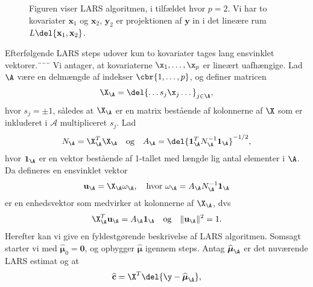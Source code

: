 %
\begin{figure}[H]
\centering
\scalebox{0.8}{}
\caption{Figuren viser LARS algoritmen, i tilfældet hvor $p = 2$. Vi har to kovariater  $\textbf{x}_1$ og $\textbf{x}_2$, $\textbf{y}_2$ er projektionen af $\textbf{y}$ in i det lineære rum $L  \del{ \textbf{x}_1, \textbf{x}_2} $. }\label{fig:lars}
\end{figure}
%
Efterfølgende LARS steps udover kun to kovariater tages lang ensvinklet vektorer.¨¨¨
Vi antager, at kovariaterne \(\x_1, \ldots, \x_p\) er lineært uafhængige.
Lad \(\A\) være en delmængde af indekser \(\cbr{1,\ldots, p}\), og definer matricen
\begin{align}
\X_\A = \del{\dots s_j \x_j \dots}_{j \in \A}, \label{eq:lars_2.4}
\end{align}
hvor  $s_j = \pm 1$, således at \(\X_\A\) er en matrix bestående af kolonnerne af \(\X\) som er inkluderet i \(\mathcal{A}\) multipliceret \(s_j\).
Lad 
\begin{align}
N_\A = \X_\A^T \X_\A \quad \text{og} \quad A_\A = \del{\mathbf{1}_\A^T N_\A^{-1} \mathbf{1}_\A}^{-1/2}, \label{eq:lars_2.5}
\end{align}
hvor \(\mathbf{1}_\A\) er en vektor bestående af 1-tallet med længde lig antal elementer i \(\A\).
Da defineres en ensvinklet vektor
\begin{align}
\mathbf{u}_\A = \X_\A \omega_\A, \quad \text{hvor } \omega_\A = A_\A N_\A^{-1} \mathbf{1}_\A \label{eq:lars_2.6}
\end{align}
er en enhedsvektor som medvirker at kolonnerne af \(\X_\A\), dvs
\begin{align*}
\X_\A^T \mathbf{u}_\A = A_\A \mathbf{1}_\A \quad \text{og} \quad \Vert \mathbf{u}_\A \Vert^2 = 1.
\end{align*}
Herefter kan vi give en fyldestgørende beskrivelse af LARS algoritmen.
Somsagt starter vi med \(\widehat{\boldsymbol{\mu}}_0 = \mathbf{0}\), og opbygger \(\widehat{\boldsymbol{\mu}}\) igennem steps.
Antag \(\widehat{\boldsymbol{\mu}}_\A\) er det nuværende LARS estimat og at
\begin{align*}
\widehat{\mathbf{c}} = \X^T \del{\y - \widehat{\boldsymbol{\mu}}_\A},
\end{align*} 
